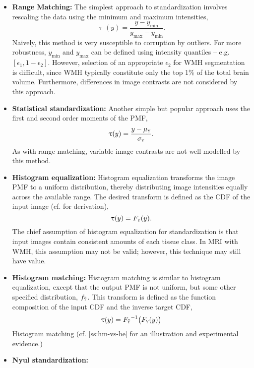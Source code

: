 \begin{itemize}
  \item \textbf{Range Matching:}
  The simplest approach to standardization involves rescaling the data using the minimum and maximum intensities,
  \begin{equation}\uptau(y) = \frac{y-y_{\min}}{y_{\max}-y_{\min}}.\end{equation}
  Naively, this method is very susceptible to corruption by outliers.
  For more robustness, $y_{\min}$ and $y_{\max}$ can be defined using intensity quantiles -- e.g. $[\epsilon_1,1-\epsilon_2]$.
  However, selection of an appropriate $\epsilon_2$ for WMH segmentation is difficult, since WMH typically constitute only the top 1\% of the total brain volume.
  Furthermore, differences in image contrasts are not considered by this approach.
  \item \textbf{Statistical standardization:}
  Another simple but popular approach uses the first and second order moments of the PMF,
  \begin{equation}\uptau(y) = \frac{y-\mu_{\textsc{y}}}{\sigma_{\textsc{y}}}.\end{equation}
  As with range matching, variable image contrasts are not well modelled by this method.
  \item \textbf{Histogram equalization:}
  Histogram equalization transforms the image PMF to a uniform distribution, thereby distributing image intensities equally across the available range.
  The desired transform  is defined as the CDF of the input image (cf. \cite{Gonzalez2006} for derivation),
  \begin{equation}\uptau(y) = F_{\textsc{y}}(y).\end{equation}
  The chief assumption of histogram equalization for standardization is that input images contain consistent amounts of each tissue class.
  In MRI with WMH, this assumption may not be valid; however, this technique may still have value.
  \item \textbf{Histogram matching:}
  Histogram matching is similar to histogram equalization, except that the output PMF is not uniform, but some other specified distribution, $f_{\tilde{\textsc{y}}}$.
  This transform is defined as the function composition of the input CDF and the inverse target CDF,
  \begin{equation}\uptau(y) = {F_{\tilde{\textsc{y}}}}^{-1}\big(F_{\textsc{y}}(y)\big)\end{equation}
  Histogram matching 
  (cf. \ref{ss:hm-vs-he} for an illustration and experimental evidence.)
  \item \textbf{Nyul standardization:}

\end{itemize}

